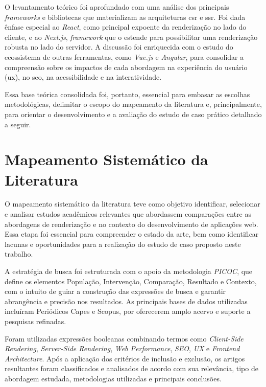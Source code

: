 O levantamento teórico foi aprofundado com uma análise dos principais \textit{frameworks} e bibliotecas que materializam as arquiteturas \acrshort{csr} e \acrshort{ssr}. Foi dada ênfase especial ao \textit{React}, como principal expoente da renderização no lado do cliente, e ao \textit{Next.js}, \textit{framework} que o estende para possibilitar uma renderização robusta no lado do servidor. A discussão foi enriquecida com o estudo do ecossistema de outras ferramentas, como \textit{Vue.js} e \textit{Angular}, para consolidar a compreensão sobre os impactos de cada abordagem na experiência do usuário (\acrshort{ux}), no \acrshort{seo}, na acessibilidade e na interatividade.

Essa base teórica consolidada foi, portanto, essencial para embasar as escolhas metodológicas, delimitar o escopo do mapeamento da literatura e, principalmente, para orientar o desenvolvimento e a avaliação do estudo de caso prático detalhado a seguir.

\section{Mapeamento Sistemático da Literatura}
\label{sec:mapemento-sistematico-da-literatura}

O mapeamento sistemático da literatura teve como objetivo identificar, selecionar e analisar estudos acadêmicos relevantes que abordassem comparações entre as abordagens de renderização  e  no contexto do desenvolvimento de aplicações web. Essa etapa foi essencial para compreender o estado da arte, bem como identificar lacunas e oportunidades para a realização do estudo de caso proposto neste trabalho.

A estratégia de busca foi estruturada com o apoio da metodologia \textit{PICOC}, que define os elementos População, Intervenção, Comparação, Resultado e Contexto, com o intuito de guiar a construção das expressões de busca e garantir abrangência e precisão nos resultados. As principais bases de dados utilizadas incluíram Periódicos Capes e Scopus, por oferecerem amplo acervo e suporte a pesquisas refinadas.

Foram utilizadas expressões booleanas combinando termos como \textit{Client-Side Rendering}, \textit{Server-Side Rendering}, \textit{Web Performance}, \textit{SEO}, \textit{UX} e \textit{Frontend Architecture}. Após a aplicação dos critérios de inclusão e exclusão, os artigos resultantes foram classificados e analisados de acordo com sua relevância, tipo de abordagem estudada, metodologias utilizadas e principais conclusões.


